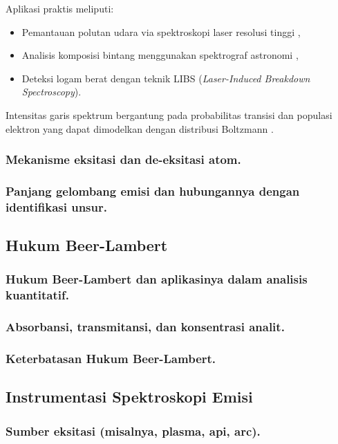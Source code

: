 Aplikasi praktis meliputi:
\begin{itemize}
\item Pemantauan polutan udara via spektroskopi laser resolusi tinggi \citep{Demtroder2010},
\item Analisis komposisi bintang menggunakan spektrograf astronomi \citep{Kaufmann2020},
\item Deteksi logam berat dengan teknik LIBS (\textit{Laser-Induced Breakdown Spectroscopy}).
\end{itemize}

Intensitas garis spektrum bergantung pada probabilitas transisi dan populasi elektron yang dapat dimodelkan dengan distribusi Boltzmann \citep{Demtroder2010}.
\subsubsection{Mekanisme eksitasi dan de-eksitasi atom.}
\subsubsection{Panjang gelombang emisi dan hubungannya dengan identifikasi unsur.}


\subsection{Hukum Beer-Lambert}

\subsubsection{Hukum Beer-Lambert dan aplikasinya dalam analisis kuantitatif.}
\subsubsection{Absorbansi, transmitansi, dan konsentrasi analit.}
\subsubsection{Keterbatasan Hukum Beer-Lambert.}


\subsection{Instrumentasi Spektroskopi Emisi}

\subsubsection{Sumber eksitasi (misalnya, plasma, api, arc).}

